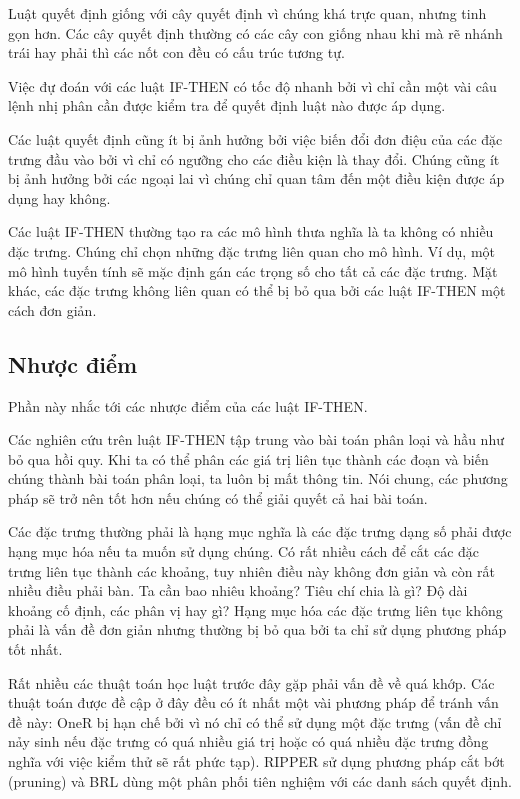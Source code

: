 Luật quyết định giống với cây quyết định vì chúng khá trực quan, nhưng tinh gọn hơn. Các cây quyết định thường có các cây con giống nhau khi mà rẽ nhánh trái hay phải thì các nốt con đều có cấu trúc tương tự.

Việc đự đoán với các luật IF-THEN có tốc độ nhanh bởi vì chỉ cần một vài câu lệnh nhị phân cần được kiểm tra để quyết định luật nào được áp dụng.

Các luật quyết định cũng ít bị ảnh hưởng bởi việc biến đổi đơn điệu của các đặc trưng đầu vào bởi vì chỉ có ngưỡng cho các điều kiện là thay đổi. Chúng cũng ít bị ảnh hưởng bởi các ngoại lai vì chúng chỉ quan tâm đến một điều kiện được áp dụng hay không.

Các luật IF-THEN thường tạo ra các mô hình thưa nghĩa là ta không có nhiều đặc trưng. Chúng chỉ chọn những đặc trưng liên quan cho mô hình. Ví dụ, một mô hình tuyến tính sẽ mặc định gán các trọng số cho tất cả các đặc trưng. Mặt khác, các đặc trưng không liên quan có thể bị bỏ qua bởi các luật IF-THEN một cách đơn giản.

\subsection{Nhược điểm}

Phần này nhắc tới các nhược điểm của các luật IF-THEN.

Các nghiên cứu trên luật IF-THEN tập trung vào bài toán phân loại và hầu như bỏ qua hồi quy. Khi ta có thể phân các giá trị liên tục thành các đoạn và biến chúng thành bài toán phân loại, ta luôn bị mất thông tin. Nói chung, các phương pháp sẽ trở nên tốt hơn nếu chúng có thể giải quyết cả hai bài toán.

Các đặc trưng thường phải là hạng mục nghĩa là các đặc trưng dạng số phải được hạng mục hóa nếu ta muốn sử dụng chúng. Có rất nhiều cách để cắt các đặc trưng liên tục thành các khoảng, tuy nhiên điều này không đơn giản và còn rất nhiều điều phải bàn. Ta cần bao nhiêu khoảng? Tiêu chí chia là gì? Độ dài khoảng cố định, các phân vị hay gì? Hạng mục hóa các đặc trưng liên tục không phải là vấn đề đơn giản nhưng thường bị bỏ qua bởi ta chỉ sử dụng phương pháp tốt nhất.

Rất nhiều các thuật toán học luật trước đây gặp phải vấn đề về quá khớp. Các thuật toán được đề cập ở đây đều có ít nhất một vài phương pháp để tránh vấn đề này: OneR bị hạn chế bởi vì nó chỉ có thể sử dụng một đặc trưng (vấn đề chỉ nảy sinh nếu đặc trưng có quá nhiều giá trị hoặc có quá nhiều đặc trưng đồng nghĩa với việc kiểm thử sẽ rất phức tạp). RIPPER sử dụng phương pháp cắt bớt (pruning) và BRL dùng một phân phối tiên nghiệm với các danh sách quyết định.

